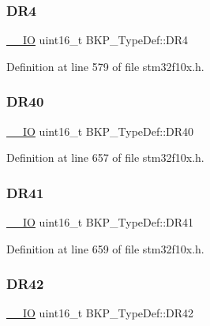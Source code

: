 \subsubsection{\texorpdfstring{D\+R4}{DR4}}
{\footnotesize\ttfamily \hyperlink{core__sc300_8h_aec43007d9998a0a0e01faede4133d6be}{\+\_\+\+\_\+\+IO} uint16\+\_\+t B\+K\+P\+\_\+\+Type\+Def\+::\+D\+R4}



Definition at line 579 of file stm32f10x.\+h.

\mbox{\label{struct_b_k_p___type_def_a1811cf03bde48bc9becc8795d3e09d7f}} 
\subsubsection{\texorpdfstring{D\+R40}{DR40}}
{\footnotesize\ttfamily \hyperlink{core__sc300_8h_aec43007d9998a0a0e01faede4133d6be}{\+\_\+\+\_\+\+IO} uint16\+\_\+t B\+K\+P\+\_\+\+Type\+Def\+::\+D\+R40}



Definition at line 657 of file stm32f10x.\+h.

\mbox{\label{struct_b_k_p___type_def_a9e9b72b388e2ed718df333cfb9e90226}} 
\subsubsection{\texorpdfstring{D\+R41}{DR41}}
{\footnotesize\ttfamily \hyperlink{core__sc300_8h_aec43007d9998a0a0e01faede4133d6be}{\+\_\+\+\_\+\+IO} uint16\+\_\+t B\+K\+P\+\_\+\+Type\+Def\+::\+D\+R41}



Definition at line 659 of file stm32f10x.\+h.

\mbox{\label{struct_b_k_p___type_def_af7a01e3a3e1be76ebb8100e7ff6de9c0}} 
\subsubsection{\texorpdfstring{D\+R42}{DR42}}
{\footnotesize\ttfamily \hyperlink{core__sc300_8h_aec43007d9998a0a0e01faede4133d6be}{\+\_\+\+\_\+\+IO} uint16\+\_\+t B\+K\+P\+\_\+\+Type\+Def\+::\+D\+R42}



